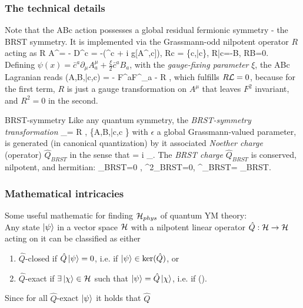 \subsubsection{The technical details}
Note that the ABc action  possesses a global residual fermionic symmetry - the BRST
symmetry. It is implemented via the Grassmann-odd nilpotent operator $R$ acting as
\be 
R A^\mu = - D^\mu c = -(\partial^\mu c + i g[A^\mu,c]), \; Rc =  \{c,\bar{c}\},\; R\bar{c}=-B, \; RB=0.
\ee 
Defining $\psi(x)= \bar{c}^a \partial_\mu A^\mu_a + \frac{\xi}{2} \bar{c}^aB_a$, with the \emph{gauge-fixing parameter} $\xi$, the ABc Lagranian reads
\be 
\mL(A,B,\bar{c},c) = -  F^a\munu F^{\mu \nu}_a - R \psi,
\ee 
which fulfills $R\mathcal{L}=0$, because for the first term, $R$ is just a gauge transformation on $A^\mu$ that leaves $F^2$ invariant, and $R^2=0$ in the second.\\
\begin{mybox}{BRST-symmetry}
	Like any quantum symmetry, the \emph{BRST-symmetry transformation}
	\be 
	\delta_\epsilon \Phi = \epsilon R \Phi, \quad \Phi \in \{A,B,\bar{c},c \}
	\ee 
	with $\epsilon$ a global Grassmann-valued parameter, is generated (in canonical quantization) by it associated \emph{Noether charge} (operator) $\hat{Q}_{BRST}$ in the sense that
	= i \delta_\epsilon \hat{\Phi}.
	\ee 
	The \emph{BRST charge} $\hat{Q}_{BRST}$ is conserved, nilpotent, and hermitian:
	\be 
	_{BRST}=0  ,\; ^2_{BRST}=0, \; ^\dagger_{BRST}= _{BRST}.
	\ee 
\end{mybox}
\subsubsection{Mathematical intricacies}
Some useful mathematic for finding $\mathcal{H}_{phys}$ of quantum YM theory:\\
Any state $\ket{\psi}$ in a vector space $\mathcal{H}$ with a nilpotent linear operator $\hat{Q}: \mathcal{H} \rightarrow \mathcal{H}$ acting on it can be classified as either
\begin{enumerate}
	\item $\hat{Q}$-closed if $\hat{Q}\ket{\psi} =0$, i.e. if $\ket{\psi}\in \ker(\hat{Q})$, or
	\item $\hat{Q}$-exact if $\exists \ket{\chi} \in \mathcal{H}$ such that $\ket{\psi} = \hat{Q}\ket{\chi}$, i.e. if 
	\bse 
	\ket{\psi} \in {}().
	\ese 
\end{enumerate}
Since for all $\hat{Q}$-exact $\ket{\psi}$ it holds that $\hat{Q}$









